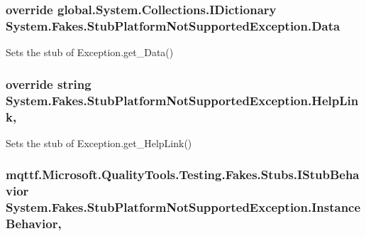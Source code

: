 \hypertarget{class_system_1_1_fakes_1_1_stub_platform_not_supported_exception_a87776c862af5124ef4f510bdc038543a}{
\subsubsection[{Data}]{\setlength{\rightskip}{0pt plus 5cm}override global.\-System.\-Collections.\-I\-Dictionary System.\-Fakes.\-Stub\-Platform\-Not\-Supported\-Exception.\-Data\hspace{0.3cm}{\ttfamily [get]}}}\label{class_system_1_1_fakes_1_1_stub_platform_not_supported_exception_a87776c862af5124ef4f510bdc038543a}


Sets the stub of Exception.\-get\-\_\-\-Data()

\hypertarget{class_system_1_1_fakes_1_1_stub_platform_not_supported_exception_a56b284c220fe7f947dad8a469bccb0cd}{
\subsubsection[{Help\-Link}]{\setlength{\rightskip}{0pt plus 5cm}override string System.\-Fakes.\-Stub\-Platform\-Not\-Supported\-Exception.\-Help\-Link\hspace{0.3cm}{\ttfamily [get]}, {\ttfamily [set]}}}\label{class_system_1_1_fakes_1_1_stub_platform_not_supported_exception_a56b284c220fe7f947dad8a469bccb0cd}


Sets the stub of Exception.\-get\-\_\-\-Help\-Link()

\hypertarget{class_system_1_1_fakes_1_1_stub_platform_not_supported_exception_ad5bdaf74d5ab1a1f34d971013a21b9e7}{
\subsubsection[{Instance\-Behavior}]{\setlength{\rightskip}{0pt plus 5cm}mqttf.\-Microsoft.\-Quality\-Tools.\-Testing.\-Fakes.\-Stubs.\-I\-Stub\-Behavior System.\-Fakes.\-Stub\-Platform\-Not\-Supported\-Exception.\-Instance\-Behavior\hspace{0.3cm}{\ttfamily [get]}, {\ttfamily [set]}}}\label{class_system_1_1_fakes_1_1_stub_platform_not_supported_exception_ad5bdaf74d5ab1a1f34d971013a21b9e7}



